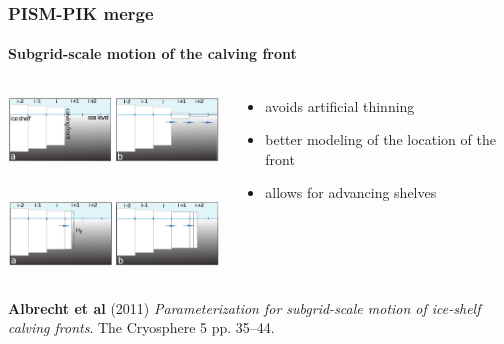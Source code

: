 \documentclass[hide notes,intlimits]{beamer}
\begin{document}
\begin{frame}
  \frametitle{PISM-PIK merge}
  \framesubtitle{Subgrid-scale motion of the calving front}
  \begin{columns}
    \begin{column}{60mm}
      \includegraphics[width=60mm]{part-grid-scheme-1.png}\\
      \rule{0pt}{5mm}\\
      \includegraphics[width=60mm]{part-grid-scheme-2.png}\\
   \end{column}
    \begin{column}{60mm}
      \begin{itemize}
      \item avoids artificial thinning
      \item better modeling of the location of the front
      \item allows for advancing shelves
      \end{itemize}
   \end{column}
  \end{columns}
   \begin{flushleft}
      \tiny \textbf{Albrecht et al} (2011)
      \emph{Parameterization for subgrid-scale motion of ice-shelf calving
        fronts}. The Cryosphere 5 pp. 35--44.
   \end{flushleft}
\end{frame}
\end{document}
